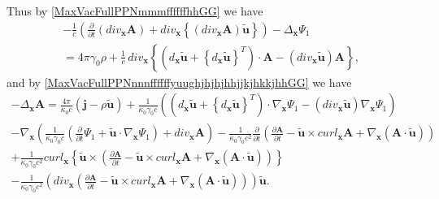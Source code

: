 \documentclass{article}
\theoremstyle{definition}
\theoremstyle{remark}
\renewcommand{\vec}[1]{\mathbf{#1}}
\newcommand{\er}{\eqref}
\newcommand{\er}{\eqref}
\begin{document}
Thus by \er{MaxVacFullPPNmmmffffffhhGG} we have
\begin{multline}\label{MaxVacFullPPNmmmffffffhhtygghGG}
-\frac{1}{c}\left(\frac{\partial}{\partial t}\left(div_{\vec x}\vec
A\right)+div_{\vec x} \left\{\left(div_{\vec x}\vec A\right)\vec
{\tilde u}\right\}\right)-\Delta_{\vec
x}\Psi_1\\=4\pi\gamma_0\rho+\frac{1}{c}\,div_{\vec x}
\left\{\left(d_{\vec x}\vec {\tilde u}+\left\{d_{\vec x}\vec {\tilde
u}\right\}^T\right)\cdot\vec A-\left(div_{\vec x}\vec {\tilde
u}\right)\vec A\right\},
\end{multline}
and by \er{MaxVacFullPPNnnnffffffyuughjhjhjhhjjkjhkkjhhGG} we have
\begin{multline}\label{MaxVacFullPPNnnnffffffyuughjhjhjhhjjkjhkkjhhjhghGG}
-\Delta_{\vec x}\vec A= \frac{4\pi}{\kappa_0 c}\left(\vec j-\rho\vec
{\tilde u}\right)+\frac{1}{\kappa_0\gamma_0 c}\left(\left(d_{\vec
x}\vec {\tilde u}+\left\{d_{\vec x}\vec {\tilde
u}\right\}^T\right)\cdot \nabla_{\vec x}\Psi_1-\left(div_{\vec
x}\vec {\tilde u}\right)\nabla_{\vec x}\Psi_1\right)\\-\nabla_{\vec
x}\left(\frac{1}{\kappa_0\gamma_0 c}\left(\frac{\partial}{\partial
t}\Psi_1+\vec {\tilde u}\cdot\nabla_{\vec x}\Psi_1\right)+div_{\vec
x} \vec A\right)-\frac{1}{\kappa_0\gamma_0
c^2}\frac{\partial}{\partial t}\left(\frac{\partial\vec A}{\partial
t}-\vec {\tilde u}\times curl_{\vec x}\vec A+\nabla_{\vec
x}\left(\vec A\cdot\vec {\tilde
u}\right)\right)\\+\frac{1}{\kappa_0\gamma_0 c^2}curl_{\vec x}
\left\{\vec {\tilde u}\times
\left(\frac{\partial\vec A}{\partial t}-\vec {\tilde u}\times
curl_{\vec x}\vec A+\nabla_{\vec x}\left(\vec A\cdot\vec {\tilde
u}\right)\right)\right\}\\-\frac{1}{\kappa_0\gamma_0
c^2}\left(div_{\vec x}\left(\frac{\partial\vec A}{\partial t}-\vec
{\tilde u}\times curl_{\vec x}\vec A+\nabla_{\vec x}\left(\vec
A\cdot\vec {\tilde u}\right)\right)\right)\vec {\tilde u}.
\end{multline}
\end{document}
